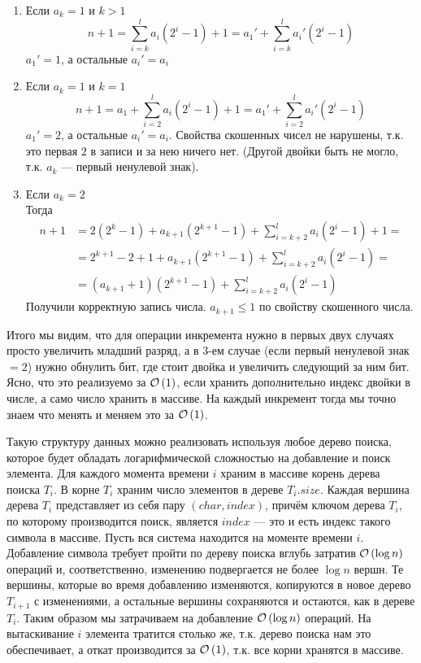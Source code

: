 \begin{enumerate}[label={\textbf{(\alph*)}}]
\begin{enumerate}
\item Если $a_k=1$ и $k>1$\\
\[n+1 = \sum_{i=k}^{l}{a_i(2^i-1)} + 1 = a_1'+\sum_{i=k}^{l}{a_i'(2^i-1)}\]
$a_1'=1$, а остальные $a_i'=a_i$
\item Если $a_k=1$ и $k=1$\\
\[ n+1 = a_1 + \sum_{i=2}^{l}{a_i(2^i-1)}+1=a_1'+\sum_{i=2}^{l}{a_i'(2^i-1)} \]
$a_1'=2$, а остальные $a_i'=a_i$. Свойства скошенных чисел не нарушены, т.к. это первая $2$
в записи и за нею ничего нет. (Другой двойки быть не могло, т.к. $a_k$ --- первый ненулевой знак).
\item Если $a_k=2$\\
Тогда 
\begin{equation*}
\begin{split}
n+1 &= 2(2^k-1)+a_{k+1}(2^{k+1}-1)+\sum_{i=k+2}^{l}{a_i(2^i-1)}+1 =\\
    &= 2^{k+1}-2+1+a_{k+1}(2^{k+1}-1)+\sum_{i=k+2}^{l}{a_i(2^i-1)} =\\
    &= (a_{k+1}+1)(2^{k+1}-1)+\sum_{i=k+2}^{l}{a_i(2^i-1)}
\end{split}
\end{equation*}
Получили корректную запись числа. $a_{k+1}\leq 1$ по свойству скошенного числа.
\end{enumerate}
Итого мы видим, что для операции инкремента нужно в первых двух случаях просто увеличить 
младший разряд, а в 3-ем случае (если первый ненулевой знак $= 2$) нужно обнулить бит,
где стоит двойка и увеличить следующий за ним бит.
Ясно, что это реализуемо за $\mathcal{O}\left(1\right)$, если хранить дополнительно индекс двойки в числе, 
а само число хранить в массиве. На каждый инкремент тогда мы точно знаем что менять и меняем
это за $\mathcal{O}\left(1\right)$. \xqed
\end{enumerate}

\task{-}
\task{-}

Такую структуру данных можно реализовать используя любое дерево поиска, которое будет
обладать логарифмической сложностью на добавление и поиск элемента. Для каждого момента
времени $i$ храним в массиве корень дерева поиска $T_i$. В корне $T_i$ храним число элементов
в дереве $T_i.size$. Каждая вершина дерева $T_i$ представляет из себя пару $(char, index)$, причём
ключом дерева $T_i$, по которому производится поиск, является $index$ --- это и есть индекс такого
символа в массиве. Пусть вся система находится на моменте времени $i$. Добавление символа требует 
пройти по дереву поиска вглубь затратив $\mathcal{O}\left(\log{n}\right)$ операций и, соответственно, изменению подвергается
не более $\log{n}$ вершн. Те вершины, которые во время добавлению изменяются, копируются в новое дерево
$T_{i+1}$ с изменениями, а остальные вершины сохраняются и остаются, как в дереве $T_i$. Таким образом
мы затрачиваем на добавление $\mathcal{O}\left(\log{n}\right)$ операций. На вытаскивание $i$ элемента тратится столько
же, т.к. дерево поиска нам это обеспечивает, а откат производится за $\mathcal{O}\left(1\right)$, т.к. все корни хранятся
в массиве. \xqed

